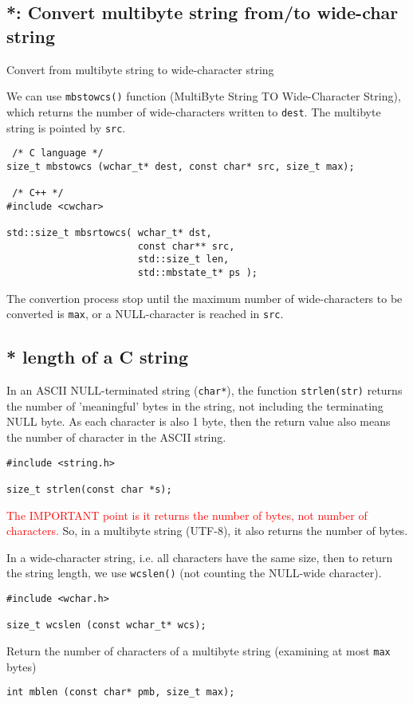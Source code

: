 \subsection{*: Convert multibyte string from/to wide-char string}


Convert from multibyte string to wide-character string

We can use \verb!mbstowcs()! function (MultiByte String TO Wide-Character
String), which returns the number of wide-characters written to \verb!dest!. The
multibyte string is pointed by \verb!src!. 
\begin{Verbatim}
 /* C language */
size_t mbstowcs (wchar_t* dest, const char* src, size_t max);

 /* C++ */
#include <cwchar>

std::size_t mbsrtowcs( wchar_t* dst,
                       const char** src,
                       std::size_t len,
                       std::mbstate_t* ps );
\end{Verbatim}
The convertion process stop until the maximum number of wide-characters to be
converted is \verb!max!, or a NULL-character is reached in \verb!src!. 


\subsection{* length of a C string}

In an ASCII NULL-terminated string (\verb!char*!), the function
\verb!strlen(str)! returns the number of 'meaningful' bytes in the string, not
including the terminating NULL byte. As each character is also 1 byte, then the
return value also means the number of character in the ASCII string.
\begin{verbatim}
#include <string.h>

size_t strlen(const char *s);
\end{verbatim}
\textcolor{red}{The IMPORTANT point is it returns the number of bytes, not
number of characters.} So, in a multibyte string (UTF-8), it also returns the
number of bytes.

In a wide-character string, i.e. all characters have the same size, then to
return the string length, we use \verb!wcslen()! (not counting the NULL-wide
character).
\begin{verbatim}
#include <wchar.h>

size_t wcslen (const wchar_t* wcs);
\end{verbatim}


Return the number of characters of a multibyte string (examining at most
\verb!max! bytes)
\begin{Verbatim}
int mblen (const char* pmb, size_t max);
\end{Verbatim}

